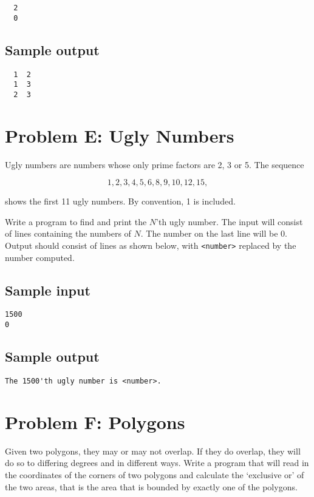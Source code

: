 \begin{verbatim}
  2
  0
\end{verbatim}

\subsection*{Sample output}

\begin{verbatim}
  1  2
  1  3
  2  3
\end{verbatim}

\newpage

\section*{Problem E: Ugly Numbers}

Ugly numbers are numbers whose only prime factors are 2, 3 or 5.
The sequence

\[1, 2, 3, 4, 5, 6, 8, 9, 10, 12, 15,\] 

shows the first 11 ugly numbers.  By convention, 1 is included.

Write a program to find and print the $N$'th ugly number. The input
will consist of lines containing the numbers of $N$. The number on the last
line will be 0. Output should consist of lines as shown below, 
with \verb|<number>| replaced by the number computed.

\subsection*{Sample input}

\begin{verbatim}
1500
0
\end{verbatim}

\subsection*{Sample output}

\begin{verbatim}
The 1500'th ugly number is <number>.
\end{verbatim}

\newpage

\section*{Problem F: Polygons}

Given two polygons, they may or may not overlap.  If they do
overlap, they will do so to differing degrees and in different ways. 
Write a program that will read in the coordinates of the corners of two
polygons and calculate the `exclusive or' of the two areas,
that is the area that is bounded by exactly one of the polygons.  

